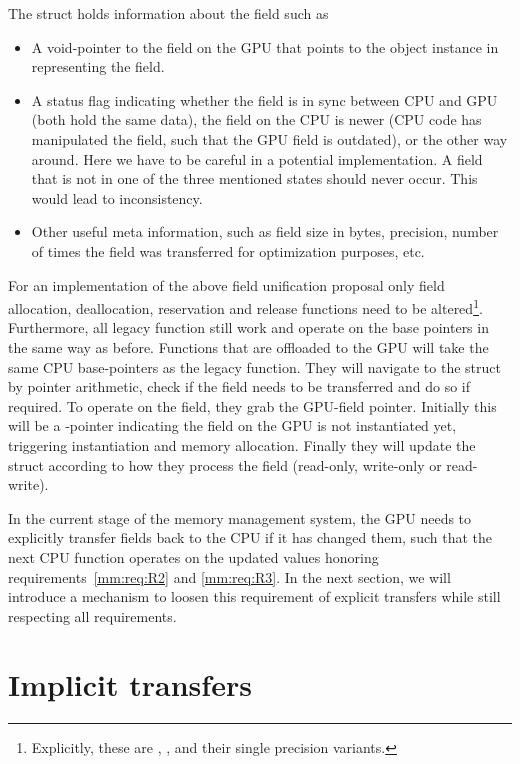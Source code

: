 The  struct holds information about the field such as
\begin{itemize}
	\item A void-pointer to the field on the GPU that points to the object instance in \quda representing the field.
	\item A status flag indicating whether the field is in sync between CPU and GPU (both hold the same data), the field on the CPU is newer (CPU code has manipulated the field, such that the GPU field is outdated), or the other way around. Here we have to be careful in a potential implementation. A field that is not in one of the three mentioned states should never occur. This would lead to inconsistency.
	\item Other useful meta information, such as field size in bytes, precision, number of times the field was transferred for optimization purposes, etc.
\end{itemize}
For an implementation of the above field unification proposal only field allocation, deallocation, reservation and release functions need to be altered\footnote{Explicitly, these are , ,  and their single precision variants.}.
Furthermore, all legacy \openqxd function still work and operate on the base pointers in the same way as before.
Functions that are offloaded to the GPU will take the same CPU base-pointers as the legacy function.
They will navigate to the  struct by pointer arithmetic, check if the field needs to be transferred and do so if required.
To operate on the field, they grab the GPU-field pointer.
Initially this will be a \NULL-pointer indicating the field on the GPU is not instantiated yet, triggering instantiation and memory allocation.
Finally they will update the  struct according to how they process the field (read-only, write-only or read-write).

In the current stage of the memory management system, the GPU needs to explicitly transfer fields back to the CPU if it has changed them, such that the next CPU function operates on the updated values honoring requirements~\ref{mm:req:R2} and \ref{mm:req:R3}.
In the next section, we will introduce a mechanism to loosen this requirement of explicit transfers while still respecting all requirements.

\section{Implicit transfers}

